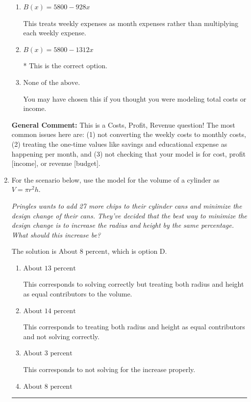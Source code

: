 \documentclass{extbook}[14pt]
\newcommand{\litem}[1]{\item #1

\rule{\textwidth}{0.4pt}}
\begin{document}
\begin{enumerate}
{\begin{enumerate}[label=\Alph*.]
This treats the educational expense and savings as something you get every month rather than a 1-time payment AND treats weekly expenses as month expenses rather than multiplying each weekly expense by 4.
\item \( B(x) = 5800 - 928 x \)

This treats weekly expenses as month expenses rather than multiplying each weekly expense.
\item \( B(x) = 5800 - 1312 x \)

* This is the correct option.
\item \( \text{None of the above.} \)

You may have chosen this if you thought you were modeling total costs or income.
\end{enumerate}

\textbf{General Comment:} This is a Costs, Profit, Revenue question! The most common issues here are: (1) not converting the weekly costs to monthly costs, (2) treating the one-time values like savings and educational expense as happening per month, and (3) not checking that your model is for cost, profit [income], or revenue [budget].
}
\litem{
For the scenario below, use the model for the volume of a cylinder as $V = \pi r^2 h$.

\begin{center}
    \textit{ Pringles wants to add 27 \text{percent} more chips to their cylinder cans and minimize the design change of their cans. They've decided that the best way to minimize the design change is to increase the radius and height by the same percentage. What should this increase be? }
\end{center}
The solution is \( \text{About } 8 \text{ percent} \), which is option D.\begin{enumerate}[label=\Alph*.]
\item \( \text{About } 13 \text{ percent} \)

This corresponds to solving correctly but treating both radius and height as equal contributors to the volume.
\item \( \text{About } 14 \text{ percent} \)

This corresponds to treating both radius and height as equal contributors and not solving correctly.
\item \( \text{About } 3 \text{ percent} \)

This corresponds to not solving for the increase properly.
\item \( \text{About } 8 \text{ percent} \)


\end{enumerate}}
\end{enumerate}
\end{document}
